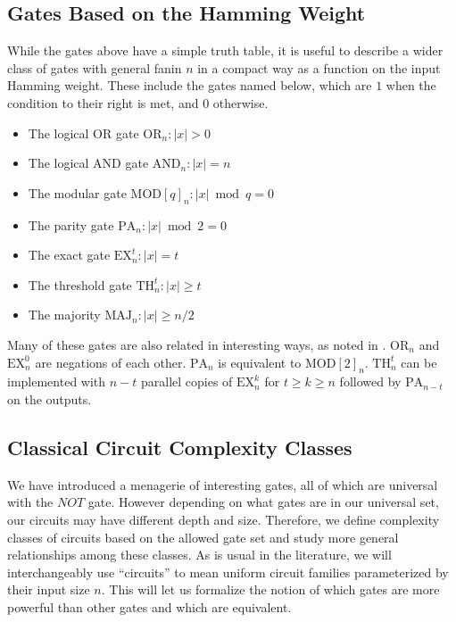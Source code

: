 \subsection{Gates Based on the Hamming Weight}

While the gates above have a simple truth table, it is
useful to describe a wider class of gates with general
fanin $n$ in a compact way as a function on the input
Hamming weight. These include the gates named below, which
are $1$ when the condition to their right is met, and $0$
otherwise.

\begin{itemize}
\item The logical OR gate $\text{OR}_n: |x| > 0$
\item The logical AND gate $\text{AND}_n: |x| = n$
\item The modular gate $\text{MOD}[q]_n: |x| \bmod q = 0$
\item The parity gate $\text{PA}_n: |x| \bmod 2 = 0$
\item The exact gate $\text{EX}^t_n: |x| = t$
\item The threshold gate $\text{TH}^t_n: |x| \ge t$
\item The majority $\text{MAJ}_n: |x| \ge n/2$
\end{itemize}

Many of these gates are also related in interesting ways,
as noted in \cite{Takahashi2011}.
$\text{OR}_n$ and $\text{EX}^0_n$ are
negations of each other. $\text{PA}_n$ is equivalent to
$\text{MOD}[2]_n$. $\text{TH}^t_n$ can be implemented with
$n-t$ parallel copies of $\text{EX}^k_n$ for $t \ge k \ge n$
followed by $\text{PA}_{n-t}$ on the outputs.

\subsection{Classical Circuit Complexity Classes}

We have introduced a menagerie of interesting gates,
all of which are universal with the $NOT$ gate. However depending
on what gates are in our universal set, our circuits may have
different depth and size. Therefore, we define complexity classes
of circuits based on the allowed gate set and study more general
relationships among these classes. As is usual in the literature,
we will interchangeably use ``circuits'' to mean uniform
circuit families parameterized by their input size $n$.
 This will let us formalize the notion of
which gates are more powerful than other gates and which are equivalent.
 
